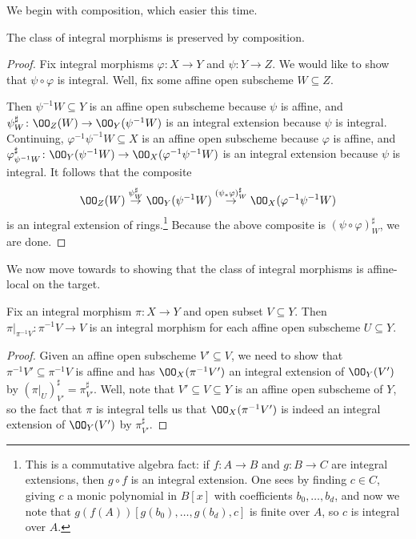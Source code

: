 \documentclass[../notes.tex]{subfiles}
\begin{document}
We begin with composition, which easier this time.
\begin{lemma} \label{lem:integral-comp}
	The class of integral morphisms is preserved by composition.
\end{lemma}
\begin{proof}
	Fix integral morphisms $\varphi\colon X\to Y$ and $\psi\colon Y\to Z$. We would like to show that $\psi\circ\varphi$ is integral. Well, fix some affine open subscheme $W\subseteq Z$.
	
	Then $\psi^{-1}W\subseteq Y$ is an affine open subscheme because $\psi$ is affine, and $\psi^\sharp_W\colon\OO_Z(W)\to\OO_Y(\psi^{-1}W)$ is an integral extension because $\psi$ is integral. Continuing, $\varphi^{-1}\psi^{-1}W\subseteq X$ is an affine open subscheme because $\varphi$ is affine, and $\varphi^\sharp_{\psi^{-1}W}\colon\OO_Y(\psi^{-1}W)\to\OO_X(\varphi^{-1}\psi^{-1}W)$ is an integral extension because $\psi$ is integral. It follows that the composite
	\[\OO_Z(W)\stackrel{\psi^\sharp_W}\to\OO_Y(\psi^{-1}W)\stackrel{(\psi_*\varphi)^\sharp_W}\to\OO_X(\varphi^{-1}\psi^{-1}W)\]
	is an integral extension of rings.\footnote{This is a commutative algebra fact: if $f\colon A\to B$ and $g\colon B\to C$ are integral extensions, then $g\circ f$ is an integral extension. One sees by finding $c\in C$, giving $c$ a monic polynomial in $B[x]$ with coefficients $b_0,\ldots,b_d$, and now we note that $g(f(A))[g(b_0),\ldots,g(b_d),c]$ is finite over $A$, so $c$ is integral over $A$.} Because the above composite is $(\psi\circ\varphi)^\sharp_W$, we are done.
\end{proof}
We now move towards to showing that the class of integral morphisms is affine-local on the target.
\begin{lemma} \label{lem:restrict-integral}
	Fix an integral morphism $\pi\colon X\to Y$ and open subset $V\subseteq Y$. Then $\pi|_{\pi^{-1}V}\colon\pi^{-1}V\to V$ is an integral morphism for each affine open subscheme $U\subseteq Y$.
\end{lemma}
\begin{proof}
	Given an affine open subscheme $V'\subseteq V$, we need to show that $\pi^{-1}V'\subseteq\pi^{-1}V$ is affine and has $\OO_X(\pi^{-1}V')$ an integral extension of $\OO_Y(V')$ by $(\pi|_{U})^\sharp_{V'}=\pi^\sharp_{V'}$. Well, note that $V'\subseteq V\subseteq Y$ is an affine open subscheme of $Y$, so the fact that $\pi$ is integral tells us that $\OO_X(\pi^{-1}V')$ is indeed an integral extension of $\OO_Y(V')$ by $\pi^\sharp_{V'}$.
\end{proof}
\end{document}
